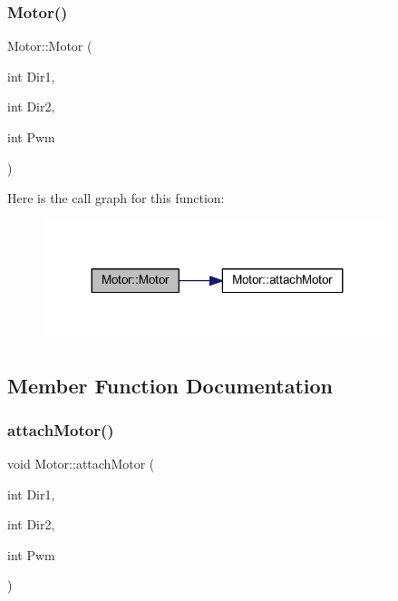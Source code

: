 \subsubsection{\texorpdfstring{Motor()}{Motor()}\hspace{0.1cm}{\footnotesize\ttfamily [2/2]}}
{\footnotesize\ttfamily Motor\+::\+Motor (\begin{DoxyParamCaption}\item[{int}]{Dir1,  }\item[{int}]{Dir2,  }\item[{int}]{Pwm }\end{DoxyParamCaption})}

Here is the call graph for this function\+:\nopagebreak
\begin{figure}[H]
\begin{center}
\leavevmode
\includegraphics[width=287pt]{class_motor_af7bad7a60264d47a368216d72704d838_cgraph}
\end{center}
\end{figure}


\subsection{Member Function Documentation}
\mbox{\label{class_motor_a6726cda4183f9b9f4fd3d8af52d9e87d}} 
\subsubsection{\texorpdfstring{attach\+Motor()}{attachMotor()}}
{\footnotesize\ttfamily void Motor\+::attach\+Motor (\begin{DoxyParamCaption}\item[{int}]{Dir1,  }\item[{int}]{Dir2,  }\item[{int}]{Pwm }\end{DoxyParamCaption})}

